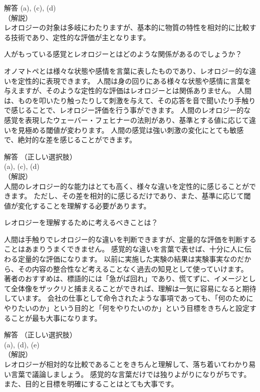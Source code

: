 \documentclass[uplatex,dvipdfmx,a4paper,11pt]{jsarticle}
\begin{document}
\begin{qlist}
\begin{itembox}[l]{解答}
        (a), (c), (d)\\
        （解説）\\
        レオロジーの対象は多岐にわたりますが、基本的に物質の特性を相対的に比較する技術であり、定性的な評価が主となります。
    \end{itembox}
	\qitem 人がもっている感覚とレオロジーとはどのような関係があるのでしょうか？
		\begin{qlist2}
            \qitem オノマトペとは様々な状態や感情を言葉に表したものであり、レオロジー的な違いを定性的に表現できます。
            \qitem 人間は身の回りにある様々な状態や感情に言葉を与えますが、そのような定性的な評価はレオロジーとは関係ありません。
			\qitem 人間は、ものを叩いたり触ったりして刺激を与えて、その応答を音で聞いたり手触りで感じることで、レオロジー評価を行う事ができます。
			\qitem 人間のレオロジー的な感覚を表現したウェーバー・フェヒナーの法則があり、基準とする値に応じて違いを見極める閾値が変わります。
            \qitem 人間の感覚は強い刺激の変化にとても敏感で、絶対的な差を感じることができます。
    \end{qlist2}
    \vspace{3mm}
    \begin{itembox}[l]{解答}
        （正しい選択肢）\\
        (a), (c), (d)\\
        （解説）\\
        人間のレオロジー的な能力はとても高く、様々な違いを定性的に感じることができます。
        ただし、その差を相対的に感じるだけであり、また、基準に応じて閾値が変化することを理解する必要があります。
    \end{itembox}
	\qitem レオロジーを理解するために考えるべきことは？
		\begin{qlist2}
			\qitem 人間は手触りでレオロジー的な違いを判断できますが、定量的な評価を判断することはあまりうまくできません。
            \qitem 感覚的な違いを言葉で表せば、十分に人に伝わる定量的な評価になります。
            \qitem 以前に実施した実験の結果は実験事実なのだから、その内容の整合性など考えることなく過去の知見として使っていけます。
			\qitem 著者のおすすめは、標語的には「急がば回れ」であり、慌てずに、イメージとして全体像をザックリと捕まえることができれば、理解は一気に容易になると期待しています。
			\qitem 会社の仕事として命令されたような事項であっても、「何のためにやりたいのか」という目的と「何をやりたいのか」という目標をきちんと設定することが最も大事になります。
		\end{qlist2}
        \begin{itembox}[l]{解答}
            （正しい選択肢）\\
            (a), (d), (e)\\
            （解説）\\
            レオロジーが相対的な比較であることをきちんと理解して、落ち着いてわかり易い言葉で議論しましょう。
            感覚的な言葉だけでは独りよがりになりがちです。
            また、目的と目標を明確にすることはとても大事です。
        \end{itembox}
\end{qlist}
\end{document}

